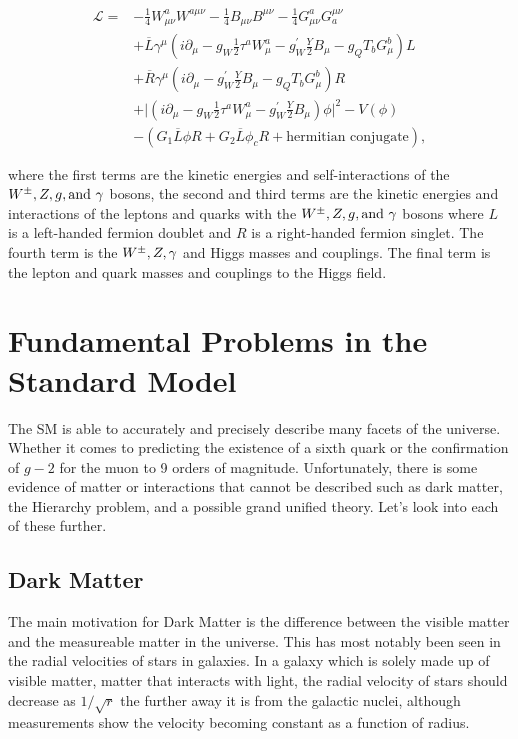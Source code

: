 \begin{equation}\label{SMLagrangian}
\begin{split}
\mathcal{L}=&-\frac{1}{4}W^a_{\mu\nu}W^{a\mu\nu}-\frac{1}{4}B_{\mu\nu}B^{\mu\nu}-\frac{1}{4}G^a_{\mu\nu}G_a^{\mu\nu} \\
&+\overline{L}\gamma^\mu(i\partial_\mu-g_{W}\frac{1}{2}\tau^{a}W^{a}_{\mu}-g^{\prime}_{W}\frac{Y}{2}B_\mu-g_{Q}T_{b}G^{b}_{\mu})L \\
&+\overline{R}\gamma^\mu(i\partial_\mu-g^{\prime}_{W}\frac{Y}{2}B_\mu-g_{Q}T_{b}G^{b}_{\mu})R \\
&+\lvert(i\partial_\mu-g_{W}\frac{1}{2}\tau^{a}W^{a}_\mu-g^{\prime}_{W}\frac{Y}{2}B_\mu)\phi\lvert^2-V(\phi) \\
&-(G_1\overline{L}\phi R+G_2\overline{L}\phi_cR+\text{hermitian conjugate}),
\end{split}
\end{equation}

where the first terms are the kinetic energies and self-interactions of the $W^\pm,Z, g, \text{and } \gamma$ bosons, the second and third terms are the kinetic energies and interactions of the leptons and quarks with the $W^\pm,Z, g, \text{and } \gamma$ bosons where $L$ is a left-handed fermion doublet and $R$ is a right-handed fermion singlet. The fourth term is the $W^\pm,Z,\gamma$ and Higgs masses and couplings. The final term is the lepton and quark masses and couplings to the Higgs field.  

\section{Fundamental Problems in the Standard Model}
\label{sec:SMIssues}

The SM is able to accurately and precisely describe many facets of the universe. Whether it comes to predicting the existence of a sixth quark or the confirmation of $g - 2$ for the muon to 9 orders of magnitude. Unfortunately, there is some evidence of matter or interactions that cannot be described such as dark matter, the Hierarchy problem, and a possible grand unified theory. Let's look into each of these further.

\subsection{Dark Matter}
The main motivation for Dark Matter is the difference between the visible matter and the measureable matter in the universe. This has most notably been seen in the radial velocities of stars in galaxies. In a galaxy which is solely made up of visible matter, matter that interacts with light, the radial velocity of stars should decrease as $1/\sqrt{r}$ the further away it is from the galactic nuclei, although measurements show the velocity becoming constant as a function of radius.

